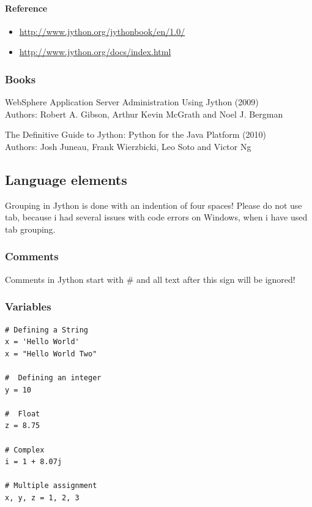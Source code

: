 \documentclass[12pt,a4paper]{article}
\begin{document}
\paragraph{Reference}

\begin{itemize}
	\item\url{http://www.jython.org/jythonbook/en/1.0/}
	\item \url{http://www.jython.org/docs/index.html}
\end{itemize}

\subsubsection{Books}

WebSphere Application Server Administration Using Jython (2009)\\
Authors: Robert A. Gibson, Arthur Kevin McGrath and Noel J. Bergman

The Definitive Guide to Jython: Python for the Java Platform (2010)\\
Authors: Josh Juneau, Frank Wierzbicki, Leo Soto and Victor Ng

\subsection{Language elements}

Grouping in Jython is done with an indention of four spaces! Please do not use tab, because i had several issues with code errors on Windows, when i have used tab grouping.

\subsubsection{Comments}

Comments in Jython start with \# and all text after this sign will be ignored!

\subsubsection{Variables}

\begin{lstlisting}[style=Python]
# Defining a String
x = 'Hello World'
x = "Hello World Two"
 
#  Defining an integer
y = 10
 
#  Float
z = 8.75
 
# Complex
i = 1 + 8.07j
 
# Multiple assignment
x, y, z = 1, 2, 3
\end{lstlisting}
\end{document}
